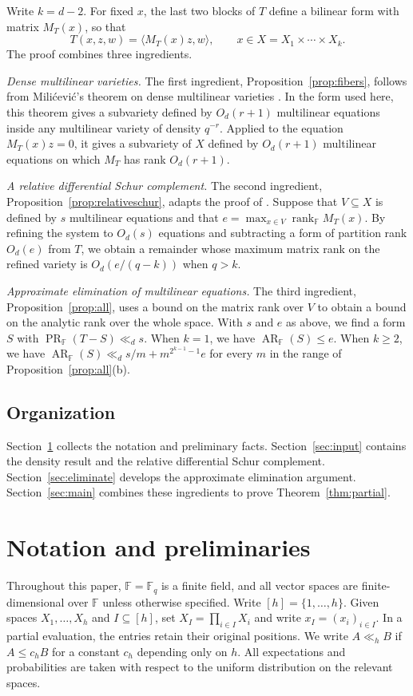 \documentclass[11pt,reqno]{amsart}
\theoremstyle{plain}
\theoremstyle{definition}
\newcommand{\F}{\mathbb F}
\DeclareMathOperator{\arank}{AR}
\DeclareMathOperator{\prank}{PR}
\DeclareMathOperator{\rk}{rank}
\begin{document}
Write $k=d-2$. For fixed $x$, the last two blocks of $T$ define a bilinear form with matrix $M_T(x)$, so that
\[
 T(x,z,w)=\langle M_T(x)z,w\rangle,\qquad
 x\in X=X_1\times\cdots\times X_k.
\]
The proof combines three ingredients.

\smallskip\noindent
\emph{Dense multilinear varieties.}
The first ingredient, Proposition~\ref{prop:fibers}, follows from Mili\'cevi\'c's theorem on dense multilinear varieties \cite{Milicevic}. In the form used here, this theorem gives a subvariety defined by $O_d(r+1)$ multilinear equations inside any multilinear variety of density $q^{-r}$. Applied to the equation $M_T(x)z=0$, it gives a subvariety of $X$ defined by $O_d(r+1)$ multilinear equations on which $M_T$ has rank $O_d(r+1)$.

\smallskip\noindent
\emph{A relative differential Schur complement.}
The second ingredient, Proposition~\ref{prop:relativeschur}, adapts the proof of \cite[Theorem~1.1]{MZSchur}. Suppose that $V\subseteq X$ is defined by $s$ multilinear equations and that $e=\max_{x\in V}\rk_{\F} M_T(x)$. By refining the system to $O_d(s)$ equations and subtracting a form of partition rank $O_d(e)$ from $T$, we obtain a remainder whose maximum matrix rank on the refined variety is $O_d(e/(q-k))$ when $q>k$.

\smallskip\noindent
\emph{Approximate elimination of multilinear equations.}
The third ingredient, Proposition~\ref{prop:all}, uses a bound on the matrix rank over $V$ to obtain a bound on the analytic rank over the whole space. With $s$ and $e$ as above, we find a form $S$ with $\prank_{\F}(T-S)\ll_d s$. When $k=1$, we have $\arank_{\F}(S)\leq e$. When $k\geq2$, we have $\arank_{\F}(S)\ll_d s/m+m^{2^{k-1}-1}e$ for every $m$ in the range of Proposition~\ref{prop:all}\textup{(b)}.
\subsection{Organization}
Section~\ref{sec:notation} collects the notation and preliminary
facts. Section~\ref{sec:input} contains the density result and the
relative differential Schur complement. Section~\ref{sec:eliminate}
develops the approximate elimination argument.
Section~\ref{sec:main} combines these ingredients to prove
Theorem~\ref{thm:partial}.
\section{Notation and preliminaries}\label{sec:notation}
Throughout this paper, $\F=\mathbb F_q$ is a finite field, and all vector spaces are finite-dimensional over $\F$ unless otherwise specified. Write $[h]=\{1,\ldots,h\}$. Given spaces $X_1,\ldots,X_h$ and $I\subseteq[h]$, set $X_I=\prod_{i\in I}X_i$ and write $x_I=(x_i)_{i\in I}$. In a partial evaluation, the entries retain their original positions. We write $A\ll_h B$ if $A\leq c_h B$ for a constant $c_h$ depending only on $h$. All expectations and probabilities are taken with respect to the uniform distribution on the relevant spaces.
\end{document}
